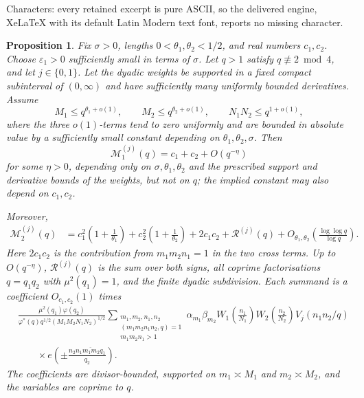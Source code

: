\documentclass[10pt,a4paper]{amsart}
\newtheorem{prop}[lem]{Proposition}
\newcommand{\e}{e}
\renewcommand{\le}{\leqslant}
\begin{document}
Characters: every retained excerpt is pure ASCII, so the delivered engine, XeLaTeX with its default Latin Modern text font, reports no missing character.
\begin{prop}\label{prop:fixed-parity-qw-setup}
Fix $\sigma>0$, lengths $0<\theta_1,\theta_2<1/2$, and real numbers $c_1,c_2$. Choose $\varepsilon_1>0$ sufficiently small in terms of $\sigma$. Let $q>1$ satisfy $q\not\equiv2\bmod4$, and let $j\in\{0,1\}$. Let the dyadic weights be supported in a fixed compact subinterval of $(0,\infty)$ and have sufficiently many uniformly bounded derivatives. Assume
$$
M_1\le q^{\theta_1+o(1)},\qquad
M_2\le q^{\theta_2+o(1)},\qquad
N_1N_2\le q^{1+o(1)},
$$
where the three $o(1)$-terms tend to zero uniformly and are bounded in absolute value by a sufficiently small constant depending on $\theta_1,\theta_2,\sigma$. Then
$$
\mathcal M_1^{(j)}(q)=c_1+c_2+O(q^{-\eta})
$$
for some $\eta>0$, depending only on $\sigma,\theta_1,\theta_2$ and the prescribed support and derivative bounds of the weights, but not on $q$; the implied constant may also depend on $c_1,c_2$.

Moreover,
$$
\begin{aligned}
\mathcal M_2^{(j)}(q)
&=
c_1^2\left(1+\frac{1}{\theta_1}\right)
+c_2^2\left(1+\frac{1}{\theta_2}\right)
+2c_1c_2+\mathcal R^{(j)}(q)
+O_{\theta_1,\theta_2}\left(\frac{\log\log q}{\log q}\right).
\end{aligned}
$$
Here $2c_1c_2$ is the contribution from $m_1m_2n_1=1$ in the two cross terms. Up to $O(q^{-\eta})$, $\mathcal R^{(j)}(q)$ is the sum over both signs, all coprime factorisations $q=q_1q_2$ with $\mu^2(q_1)=1$, and the finite dyadic subdivision. Each summand is a coefficient $O_{c_1,c_2}(1)$ times
$$
\begin{aligned}
&\frac{\mu^2(q_1)\varphi(q_2)}
{\varphi^*(q)q^{1/2}(M_1M_2N_1N_2)^{1/2}}
\sum_{\substack{m_1,m_2,n_1,n_2\\ (m_1m_2n_1n_2,q)=1\\ m_1m_2n_1>1}}
\alpha_{m_1}\beta_{m_2}
W_1\left(\frac{n_1}{N_1}\right)W_2\left(\frac{n_2}{N_2}\right)V_j(n_1n_2/q)\\
&\qquad\times\e\left(\pm \frac{n_2\overline{n_1m_1m_2q_1}}{q_2}\right).
\end{aligned}
$$
The coefficients are divisor-bounded, supported on $m_1\asymp M_1$ and $m_2\asymp M_2$, and the variables are coprime to $q$.
\end{prop}
\end{document}
